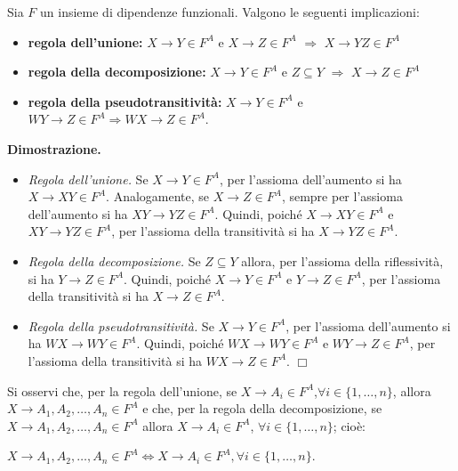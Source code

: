 \begin{theo}
Sia $F$ un insieme di dipendenze funzionali. Valgono le seguenti implicazioni:
\begin{itemize}
 \item \textbf{regola dell'unione: } $X\rightarrow Y \in F^A$ e $X\rightarrow Z \in F^A$ $\Rightarrow$ 
 $X\rightarrow YZ \in F^A$
 \item \textbf{regola della decomposizione: } $X\rightarrow Y \in F^A$ e $Z\subseteq Y$ $\Rightarrow$ 
 $X\rightarrow Z \in F^A$
 \item \textbf{regola della pseudotransitività: }$X\rightarrow Y \in F^A$ e $WY\rightarrow Z \in F^A 
 \Rightarrow WX\rightarrow Z \in F^A$.
\end{itemize}
\end{theo}
\textbf{Dimostrazione.}
\begin{itemize}
 \item \emph{Regola dell'unione.} Se $X\rightarrow Y \in F^A$, per l'assioma dell'aumento si ha $X\rightarrow 
 XY \in F^A$. Analogamente, se $X\rightarrow Z \in F^A$, sempre per l'assioma dell'aumento si ha $XY 
 \rightarrow YZ \in F^A$. Quindi, poiché $X \rightarrow XY \in F^A$ e $XY \rightarrow YZ \in F^A$, 
 per l'assioma della transitività si ha $X \rightarrow YZ \in F^A$.
 \item \emph{Regola della decomposizione.} Se $Z \subseteq Y$ allora, per l'assioma della riflessività, si ha 
 $Y \rightarrow Z \in F^A$. Quindi, poiché $X \rightarrow Y \in F^A$ e $Y \rightarrow Z \in F^A$, per l'assioma
 della transitività si ha $X\rightarrow Z \in F^A$.
 \item \emph{Regola della pseudotransitività.} Se $X \rightarrow Y \in F^A$, per l'assioma dell'aumento si 
 ha $WX \rightarrow WY \in F^A$. Quindi, poiché $WX \rightarrow WY \in F^A$ e $WY \rightarrow Z \in F^A$, 
 per l'assioma della transitività si ha $WX\rightarrow Z \in F^A$. \hfill $\Box$
\end{itemize}

Si osservi che, per la regola dell'unione, se $X\rightarrow A_i \in F^A$,$\forall i \in \{1, \ldots,n\}$, 
allora $X \rightarrow A_1, A_2, \ldots, A_n \in F^A$ e che, per la regola della decomposizione, 
se $X \rightarrow A_1, A_2, \ldots, A_n \in F^A$ allora $X\rightarrow A_i \in F^A$, $\forall i \in \{1, 
\ldots, n\}$; cioè:
\begin{center}
 \begin{math}
  X\rightarrow A_1, A_2, \ldots, A_n \in F^A \Leftrightarrow X \rightarrow A_i \in F^A, \forall i \in \{1, \ldots, n\}.
 \end{math}
\end{center}

